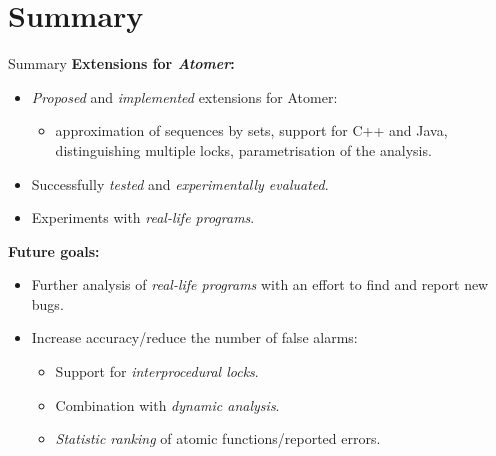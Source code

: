 \documentclass[%
    10pt, xcolor=pdflatex, hyperref={unicode}, aspectratio=169%
]{beamer}
\begin{document}
\section{Summary}
\begin{frame}{Summary}
    \textbf{\alert{Extensions} for \emph{Atomer}:}
    \medskip
    \begin{itemize}\setlength\itemsep{.5em}
        \item
            \emph{Proposed} and \emph{implemented} extensions for Atomer:
            
            \begin{itemize}
                \item
                    approximation of sequences by sets, support for C++ and
                    Java, distinguishing multiple locks, parametrisation of
                    the analysis.
            \end{itemize}
            
        \item
            Successfully \emph{tested} and \emph{experimentally evaluated}.
            
        \item
            Experiments with \emph{real-life programs}.
    \end{itemize}

    \bigskip

    \textbf{Future goals:}
    \medskip
    \begin{itemize}\setlength\itemsep{.5em}
        \item
            Further analysis of \emph{real-life programs} with
            an effort to find and report \alert{new bugs}.

        \item
            Increase \alert{accuracy}/reduce the number of \alert{false
            alarms}:

            \begin{itemize}\setlength\itemsep{.5em}
                \item
                    Support for \emph{interprocedural locks}.

                \item
                    Combination with \emph{dynamic analysis}.

                \item
                    \emph{Statistic ranking} of atomic functions/reported
                    errors.
            \end{itemize}
    \end{itemize}
\end{frame}
\end{document}
